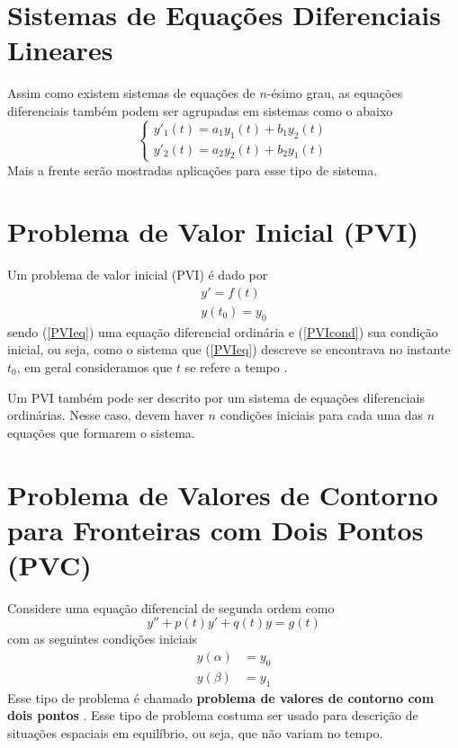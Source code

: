     \section{Sistemas de Equações Diferenciais Lineares}
    
        Assim como existem sistemas de equações de $n$-ésimo grau, as equações diferenciais também podem ser agrupadas em sistemas como o abaixo
        \begin{equation}
            \begin{cases}
                y'_1(t) = a_1y_1(t) + b_1y_2(t)\\
                y'_2(t) = a_2y_2(t) + b_2y_1(t)
            \end{cases}
        \end{equation}
	    Mais a frente serão mostradas aplicações para esse tipo de sistema.
	        
    \section{Problema de Valor Inicial (PVI)}
        \label{PVIsec}
    
        Um problema de valor inicial (PVI) é dado por
        \begin{align}
            \label{PVIeq}
            y' = f(t)\\
            \label{PVIcond}
            y(t_0) = y_0
        \end{align}
        sendo (\ref{PVIeq}) uma equação diferencial ordinária e (\ref{PVIcond}) sua condição inicial, ou seja,
        como o sistema que (\ref{PVIeq}) descreve se encontrava no instante $t_0$, em geral consideramos que $t$ se 
        refere a tempo \cite{regiIntro}.
        
        Um PVI também pode ser descrito por um sistema de equações diferenciais ordinárias. Nesse caso, devem haver $n$ condições iniciais para cada uma das $n$ equações que formarem o sistema.
        
    \section{Problema de Valores de Contorno para Fronteiras com Dois Pontos (PVC)}
    
        Considere uma equação diferencial de segunda ordem como
        \begin{equation}
            y'' + p(t)y' + q(t)y = g(t)
        \end{equation}
        com as seguintes condições iniciais
        \begin{align}
            y(\alpha) &= y_0\\
            y(\beta) &= y_1
        \end{align}
        Esse tipo de problema é chamado \textbf{problema de valores de contorno com dois pontos} \cite{boyce9}. Esse tipo de problema costuma ser usado para descrição de situações espaciais em equilíbrio, ou seja, que não variam no tempo.
        
